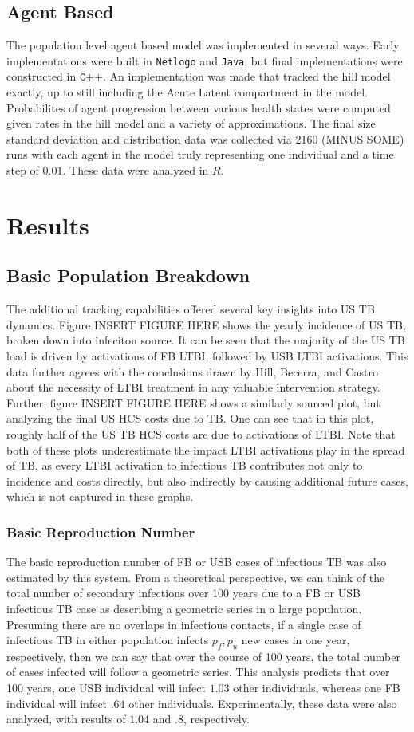 \documentclass{amsart}
\begin{document}
\subsection{Agent Based}
The population level agent based model was implemented in several ways. Early
implementations were built in \texttt{Netlogo} and \texttt{Java}, but final
implementations were constructed in $\texttt{C++}$. An implementation was made
that tracked the hill model exactly, up to still including the Acute Latent
compartment in the model. Probabilites of agent progression between various
health states were computed given rates in the hill model and a variety of
approximations. The final size standard deviation and distribution data was
collected via 2160 (MINUS SOME) runs with each agent in the model truly
representing one individual and a time step of $0.01$. These data were analyzed
in $R$. 

\section{Results}

\subsection{Basic Population Breakdown}
The additional tracking capabilities offered several key insights into US TB
dynamics. Figure INSERT FIGURE HERE shows the yearly incidence of US TB, broken
down into infeciton source. It can be seen that the majority of the US TB load
is driven by activations of FB LTBI, followed by USB LTBI activations. This data
further agrees with the conclusions drawn by Hill, Becerra, and Castro about the
necessity of LTBI treatment in any valuable intervention strategy. Further,
figure INSERT FIGURE HERE shows a similarly sourced plot, but analyzing the
final US HCS costs due to TB. One can see that in this plot, roughly half of the
US TB HCS costs are due to activations of LTBI. Note that both of these plots
underestimate the impact LTBI activations play in the spread of TB, as every
LTBI activation to infectious TB contributes not only to incidence and costs
directly, but also indirectly by causing additional future cases, which is not
captured in these graphs. 
\subsubsection{Basic Reproduction Number}
The basic reproduction number of FB or USB cases of infectious TB was also
estimated by this system. From a theoretical perspective, we can think of the
total number of secondary infections over 100 years due to a FB or USB
infectious TB case as describing a geometric series in a large population.
Presuming there are no overlaps in infectious contacts, if a single case of
infectious TB in either population infects $p_f, p_u$ new cases in one year,
respectively, then we can say that over the course of 100 years, the total
number of cases infected will follow a geometric series. This analysis predicts
that over 100 years, one USB individual will infect $1.03$ other individuals,
whereas one FB individual will infect $.64$ other individuals. Experimentally,
these data were also analyzed, with results of $1.04$ and $.8$, respectively. 
\end{document}
